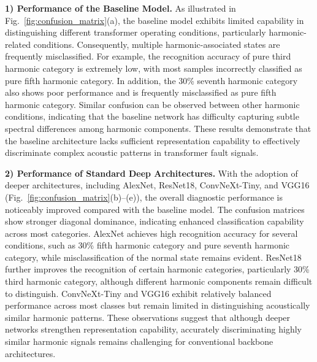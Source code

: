 \documentclass[anonymous]{iopjournal}
\begin{document}
\textbf{1) Performance of the Baseline Model.}
As illustrated in Fig.~\ref{fig:confusion_matrix}(a), the baseline model exhibits limited capability in distinguishing different transformer operating conditions, particularly harmonic-related conditions. Consequently, multiple harmonic-associated states are frequently misclassified. For example, the recognition accuracy of pure third harmonic category is extremely low, with most samples incorrectly classified as pure fifth harmonic category. In addition, the 30\% seventh harmonic category also shows poor performance and is frequently misclassified as pure fifth harmonic category. Similar confusion can be observed between other harmonic conditions, indicating that the baseline network has difficulty capturing subtle spectral differences among harmonic components. These results demonstrate that the baseline architecture lacks sufficient representation capability to effectively discriminate complex acoustic patterns in transformer fault signals.

\textbf{2) Performance of Standard Deep Architectures.}
With the adoption of deeper architectures, including AlexNet, ResNet18, ConvNeXt-Tiny, and VGG16 (Fig.~\ref{fig:confusion_matrix}(b)–(e)), the overall diagnostic performance is noticeably improved compared with the baseline model. The confusion matrices show stronger diagonal dominance, indicating enhanced classification capability across most categories. AlexNet achieves high recognition accuracy for several conditions, such as 30\% fifth harmonic category and pure seventh harmonic category, while misclassification of the normal state remains evident. ResNet18 further improves the recognition of certain harmonic categories, particularly 30\% third harmonic category, although different harmonic components remain difficult to distinguish. ConvNeXt-Tiny and VGG16 exhibit relatively balanced performance across most classes but remain limited in distinguishing acoustically similar harmonic patterns. These observations suggest that although deeper networks strengthen representation capability, accurately discriminating highly similar harmonic signals remains challenging for conventional backbone architectures.
\end{document}
